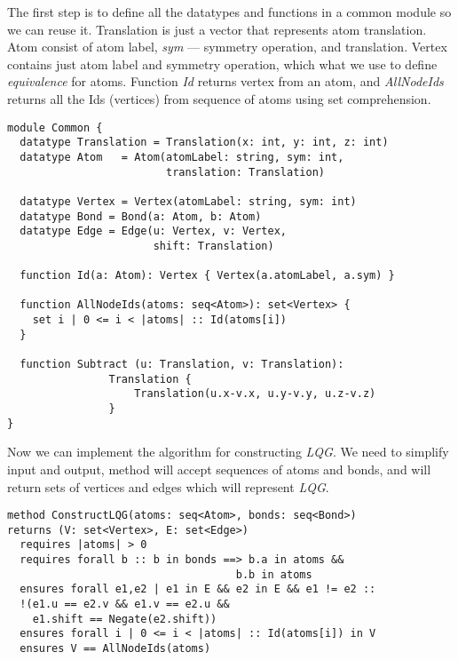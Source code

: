 The first step is to define all the datatypes and functions in a common module so we can reuse it.
Translation is just a vector that represents atom translation. Atom consist of atom label, \textit{sym} --- symmetry operation, and translation.
Vertex contains just atom label and symmetry operation, which what we use to define \textit{equivalence} for atoms. Function \textit{Id} returns vertex from an atom, and \textit{AllNodeIds} returns all the Ids (vertices) from sequence of atoms using set comprehension.

\begin{lstlisting}[caption={Common module},label={lst:common}]
module Common {
  datatype Translation = Translation(x: int, y: int, z: int)
  datatype Atom   = Atom(atomLabel: string, sym: int,
                         translation: Translation)

  datatype Vertex = Vertex(atomLabel: string, sym: int)
  datatype Bond = Bond(a: Atom, b: Atom)
  datatype Edge = Edge(u: Vertex, v: Vertex,
                       shift: Translation)

  function Id(a: Atom): Vertex { Vertex(a.atomLabel, a.sym) }

  function AllNodeIds(atoms: seq<Atom>): set<Vertex> {
    set i | 0 <= i < |atoms| :: Id(atoms[i])
  }

  function Subtract (u: Translation, v: Translation):
                Translation {
                    Translation(u.x-v.x, u.y-v.y, u.z-v.z)
                }
}
\end{lstlisting}

Now we can implement the algorithm for constructing \textit{LQG}. We need to simplify input and output, method will accept sequences of atoms and bonds, and will return sets of vertices and edges which will represent \textit{LQG}.

\begin{lstlisting}[caption={ConstructLQG specification},label={lst:constructsepcification}, literate={{forall}{forall}6 {exists}{exists}6}]
method ConstructLQG(atoms: seq<Atom>, bonds: seq<Bond>)
returns (V: set<Vertex>, E: set<Edge>)
  requires |atoms| > 0
  requires forall b :: b in bonds ==> b.a in atoms &&
                                    b.b in atoms
  ensures forall e1,e2 | e1 in E && e2 in E && e1 != e2 ::
  !(e1.u == e2.v && e1.v == e2.u &&
    e1.shift == Negate(e2.shift))
  ensures forall i | 0 <= i < |atoms| :: Id(atoms[i]) in V
  ensures V == AllNodeIds(atoms)
\end{lstlisting}

